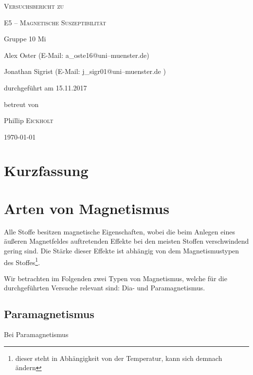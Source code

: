 \documentclass[11pt,a4paper,titlepage, ngerman]{article}
\begin{document}
	\begin{titlepage}
		\centering
		{\scshape\LARGE Versuchsbericht zu \par}
		\vspace{1cm}
		{\scshape\huge E5 -- Magnetische Suszeptibilität\par}
		\vspace{2.5cm}
		{\LARGE Gruppe 10 Mi\par}
		\vspace{0.5cm}
		{\large Alex Oster (E-Mail: a\_oste16@uni--muenster.de) \par}
		{\large Jonathan Sigrist (E-Mail: j\_sigr01@uni--muenster.de ) \par}
		\vfill
		durchgeführt am 15.11.2017\par
		betreut von\par
		{\large Phillip \textsc{Eickholt}}		
		\vfill	
		{\large \today\par}
	\end{titlepage}
		
	\tableofcontents
		
	\newpage
	
	\section{Kurzfassung}
		
		

	\newpage	
	\section{Arten von Magnetismus}
				
		Alle Stoffe besitzen magnetische Eigenschaften, wobei die beim Anlegen eines äußeren Magnetfeldes auftretenden Effekte bei den meisten Stoffen verschwindend gering sind. Die \glqq Stärke \grqq dieser Effekte ist abhängig von dem Magnetismustypen des Stoffes\footnote{dieser steht in Abhängigkeit von der Temperatur, kann sich demnach ändern}. 
				
		Wir betrachten im Folgenden zwei Typen von Magnetismus, welche für die durchgeführten Versuche relevant sind: Dia- und Paramagnetismus.
		
		\subsection{Paramagnetismus}
			
			Bei Paramagnetismus %
			
\end{document}
